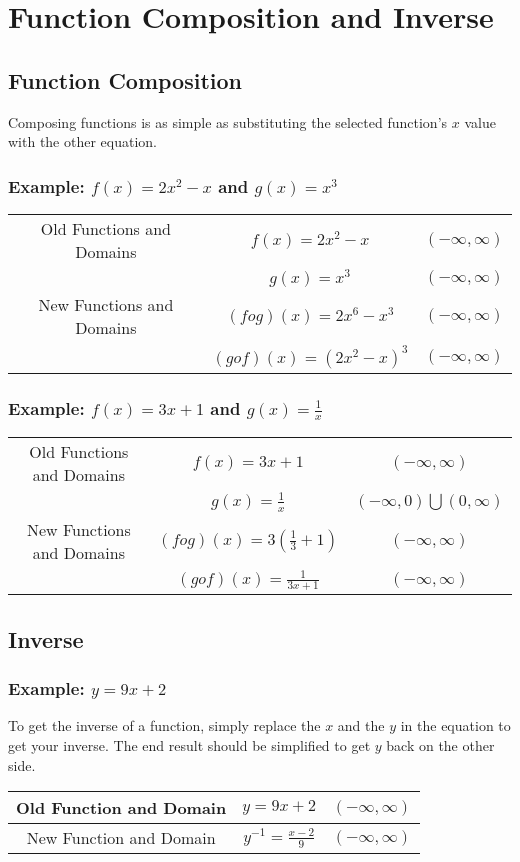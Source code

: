 \documentclass[12pt, english]{article}
\begin{document}
	\section{Function Composition and Inverse}
	\subsection{Function Composition}
	Composing functions is as simple as substituting the selected function's $x$ value with the other equation.
	\subsubsection*{Example: $f(x) = 2x^2-x$ and $g(x) = x^3$}
	\begin{center}
		\begin{tabular}{|c|c|c|}
			\hline
				Old Functions and Domains & $f(x) = 2x^2-x$ & $(-\infty, \infty)$ \\
				& $g(x) = x^3$ & $(-\infty, \infty)$ \\
			\hline
				New Functions and Domains & $(fog)(x) = 2x^{6}-x^3$ & $(-\infty, \infty)$ \\
				& $(gof)(x) = (2x^2-x)^3$ & $(-\infty, \infty)$ \\
			\hline
		\end{tabular}
	\end{center}
	\subsubsection*{Example: $f(x) = 3x+1$ and $g(x) = \frac{1}{x}$}
	\begin{center}
		\begin{tabular}{|c|c|c|}
			\hline
				Old Functions and Domains & $f(x) = 3x+1$ & $(-\infty, \infty)$ \\
				& $g(x) = \frac{1}{x}$ & $(-\infty, 0)\bigcup(0, \infty)$ \\
			\hline
				New Functions and Domains & $(fog)(x) = 3(\frac{1}{3}+1)$ & $(-\infty, \infty)$ \\
				& $(gof)(x) = \frac{1}{3x+1}$ & $(-\infty, \infty)$ \\
			\hline
		\end{tabular}
	\end{center}
	\subsection{Inverse}
	\subsubsection*{Example: $y = 9x+2$}
	To get the inverse of a function, simply replace the $x$ and the $y$ in the equation to get your inverse. The end result should be simplified
	to get $y$ back on the other side.
	\begin{center}
		\begin{tabular}{|c|c|c|}
			\hline
				Old Function and Domain & $y = 9x+2$ & $(-\infty, \infty)$ \\
			\hline
				New Function and Domain & $y^{-1} = \frac{x-2}{9}$ & $(-\infty, \infty)$ \\
			\hline
		\end{tabular}
	\end{center}
\end{document}
